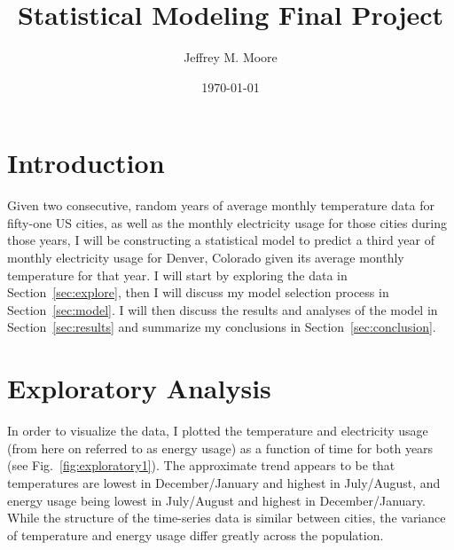 \documentclass[11pt]{article}
\begin{document}

\newcommand{\inden}[1]{\mbox{} \hspace{#1} } 

\title{\bf{Statistical Modeling Final Project}} 
\author{Jeffrey M. Moore} 



\date{\today}


\maketitle




 
\section{\label{sec:intro}Introduction}
Given two consecutive, random years of average monthly temperature data for fifty-one US cities, as well as the monthly electricity usage for those cities during those years, I will be constructing a statistical model to predict a third year of monthly electricity usage for Denver, Colorado given its average monthly temperature for that year. I will start by exploring the data in Section~\ref{sec:explore}, then I will discuss my model selection process in Section~\ref{sec:model}. I will then discuss the results and analyses of the model in Section~\ref{sec:results} and summarize my conclusions in Section~\ref{sec:conclusion}.
\section{\label{sec:explore}Exploratory Analysis}
In order to visualize the data, I plotted the temperature and electricity usage (from here on referred to as energy usage) as a function of time for both years (see Fig.~\ref{fig:exploratory1}). The approximate trend appears to be that temperatures are lowest in December/January and highest in July/August, and energy usage being lowest in July/August and highest in December/January. While the structure of the time-series data is similar between cities, the variance of temperature and energy usage differ greatly across the population.
\end{document}
